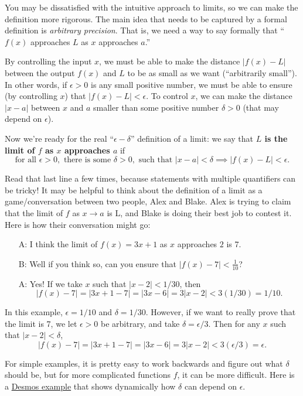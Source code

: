 \documentclass{article}
\theoremstyle{definition}
\theoremstyle{definition}
\begin{document}
You may be dissatisfied with the intuitive approach to limits, so we can make the definition more rigorous. The main idea that needs to be captured by a formal definition is \textit{arbitrary precision}. That is, we need a way to say formally that ``$f(x)$ approaches $L$ as $x$ approaches $a$.''

By controlling the input $x$, we must be able to make the distance $|f(x)-L|$ between the output $f(x)$ and $L$ to be as small as we want (``arbitrarily small''). In other words, if $\epsilon>0$ is any small positive number, we must be able to ensure (by controlling $x$) that $|f(x)-L| < \epsilon$. To control $x$, we can make the distance $|x-a|$ between $x$ and $a$ smaller than some positive number $\delta > 0$ (that may depend on $\epsilon$).

Now we're ready for the real ``$\epsilon-\delta$'' definition of a limit: we say that \textbf{$L$ is the limit of $f$ as $x$ approaches $a$} if
$$\text{for all } \epsilon > 0, \text{ there is some } \delta > 0, \text{ such that } |x - a| < \delta \implies |f(x) - L| <\epsilon.$$

Read that last line a few times, because statements with multiple quantifiers can be tricky! It may be helpful to think about the definition of a limit as a game/conversation between two people, Alex and Blake. Alex is trying to claim that the limit of $f$ as $x\to a$ is L, and Blake is doing their best job to contest it. Here is how their conversation might go:
\begin{itemize}
\item[A:] I think the limit of $f(x)=3x+1$ as $x$ approaches $2$ is 7.
\item[B:] Well if you think so, can you ensure that $|f(x)-7|<\frac{1}{10}$?
\item[A:] Yes! If we take $x$ such that $|x-2|<1/30$, then
$$|f(x)-7|=|3x + 1 - 7| = |3x-6| = 3|x-2| < 3(1/30) = 1/10.$$
\end{itemize}
In this example, $\epsilon = 1/10$ and $\delta = 1/30$. However, if we want to really prove that the limit is 7, we let $\epsilon>0$ be arbitrary, and take $\delta = \epsilon/3$. Then for any $x$ such that $|x-2|<\delta$,
$$|f(x)-7|=|3x + 1 - 7| = |3x-6| = 3|x-2| < 3(\epsilon/3) = \epsilon.$$

For simple examples, it is pretty easy to work backwards and figure out what $\delta$ should be, but for more complicated functions $f$, it can be more difficult. Here is a \href{https://www.desmos.com/calculator/cuoca85inx}{Desmos example} that shows dynamically how $\delta$ can depend on $\epsilon$.
\end{document}
